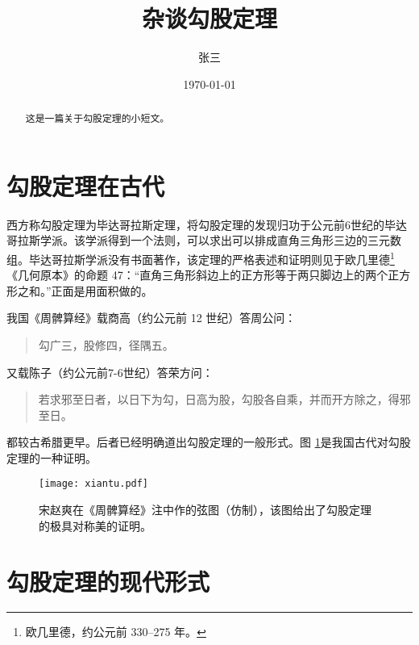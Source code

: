 \documentclass[UTF8]{ctexart}
\title{\heiti 杂谈勾股定理}
\author{\kaishu 张三}
\date{\today}
\begin{document}
\maketitle
\begin{abstract}
	这是一篇关于勾股定理的小短文。
\end{abstract}
\tableofcontents
\section{勾股定理在古代}
西方称勾股定理为毕达哥拉斯定理，将勾股定理的发现归功于公元前6世纪的毕达哥拉斯学派\cite{Kline}。该学派得到一个法则，可以求出可以排成直角三角形三边的三元数组。毕达哥拉斯学派没有书面著作，该定理的严格表述和证明则见于欧几里德\footnote{欧几里德，约公元前 330--275 年。}《几何原本》的命题 47：“直角三角形斜边上的正方形等于两只脚边上的两个正方形之和。”正面是用面积做的。

我国《周髀算经》载商高（约公元前 12 世纪）答周公问：
\begin{quote}
	\kaishu 勾广三，股修四，径隅五。
\end{quote}
又载陈子（约公元前7-6世纪）答荣方问：
\begin{quote}
	\kaishu 若求邪至日者，以日下为勾，日高为股，勾股各自乘，并而开方除之，得邪至日。
\end{quote}
都较古希腊更早。后者已经明确道出勾股定理的一般形式。图 \ref{fig:xiantu}是我国古代对勾股定理的一种证明\cite{quanjing}。
\begin{figure}[ht]
	\centering
	\texttt{[image: xiantu.pdf]}
	\caption{宋赵爽在《周髀算经》注中作的弦图（仿制），该图给出了勾股定理的极具对称美的证明。}
	\label{fig:xiantu}
\end{figure}

\section{勾股定理的现代形式}
\end{document}
